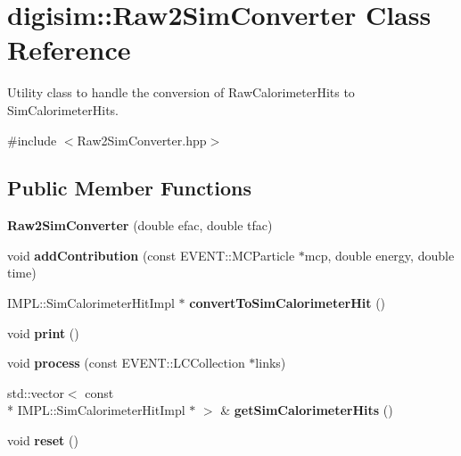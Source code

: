 \section{digisim\-:\-:Raw2\-Sim\-Converter Class Reference}
\label{classdigisim_1_1Raw2SimConverter}


Utility class to handle the conversion of Raw\-Calorimeter\-Hits to Sim\-Calorimeter\-Hits.  




{\ttfamily \#include $<$Raw2\-Sim\-Converter.\-hpp$>$}

\subsection*{Public Member Functions}
\begin{DoxyCompactItemize}
\item 
{\bfseries Raw2\-Sim\-Converter} (double efac, double tfac)\label{classdigisim_1_1Raw2SimConverter_a3b8813468d4e04fd8376a60bf000ff7a}

\item 
void {\bfseries add\-Contribution} (const E\-V\-E\-N\-T\-::\-M\-C\-Particle $\ast$mcp, double energy, double time)\label{classdigisim_1_1Raw2SimConverter_a85735b6b24724a147e18a590b73e6d82}

\item 
I\-M\-P\-L\-::\-Sim\-Calorimeter\-Hit\-Impl $\ast$ {\bfseries convert\-To\-Sim\-Calorimeter\-Hit} ()\label{classdigisim_1_1Raw2SimConverter_acfaa9558ee8dfb5b1bad8074d2dad04f}

\item 
void {\bfseries print} ()\label{classdigisim_1_1Raw2SimConverter_a921681abcd4b3a5a47e0178f21b395c1}

\item 
void {\bfseries process} (const E\-V\-E\-N\-T\-::\-L\-C\-Collection $\ast$links)\label{classdigisim_1_1Raw2SimConverter_aeaa1d246252d1ec7ba232cccf525958d}

\item 
std\-::vector$<$ const \\*
I\-M\-P\-L\-::\-Sim\-Calorimeter\-Hit\-Impl $\ast$ $>$ \& {\bfseries get\-Sim\-Calorimeter\-Hits} ()\label{classdigisim_1_1Raw2SimConverter_ac5790f350960f5ce762e28ced791c4d3}

\item 
void {\bfseries reset} ()\label{classdigisim_1_1Raw2SimConverter_a0172859c9e945b41ece695142e633514}

\end{DoxyCompactItemize}
